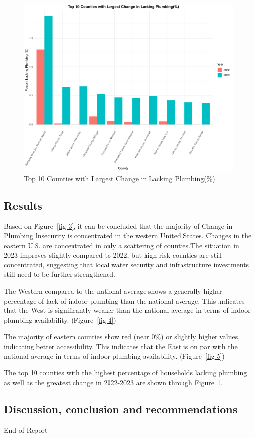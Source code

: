 \documentclass[
  letterpaper,
  DIV=11,
  numbers=noendperiod]{scrartcl}
\begin{document}
\begin{figure}[H]

{\centering \includegraphics{report_files/figure-pdf/fig-6-1.pdf}

}

\caption{\label{fig-6}Top 10 Counties with Largest Change in Lacking
Plumbing(\%)}

\end{figure}

\hypertarget{results}{%
\subsection{Results}\label{results}}

Based on Figure~\ref{fig-3}, it can be concluded that the majority of
Change in Plumbing Insecurity is concentrated in the western United
States. Changes in the eastern U.S. are concentrated in only a
scattering of counties.The situation in 2023 improves slightly compared
to 2022, but high-risk counties are still concentrated, suggesting that
local water security and infrastructure investments still need to be
further strengthened.

The Western compared to the national average shows a generally higher
percentage of lack of indoor plumbing than the national average. This
indicates that the West is significantly weaker than the national
average in terms of indoor plumbing availability. (Figure~\ref{fig-4})

The majority of eastern counties show red (near 0\%) or slightly higher
values, indicating better accessibility. This indicates that the East is
on par with the national average in terms of indoor plumbing
availability. (Figure~\ref{fig-5})

The top 10 counties with the highest percentage of households lacking
plumbing as well as the greatest change in 2022-2023 are shown through
Figure~\ref{fig-6}.

\hypertarget{discussion-conclusion-and-recommendations}{%
\subsection{Discussion, conclusion and
recommendations}\label{discussion-conclusion-and-recommendations}}

End of Report
\end{document}
